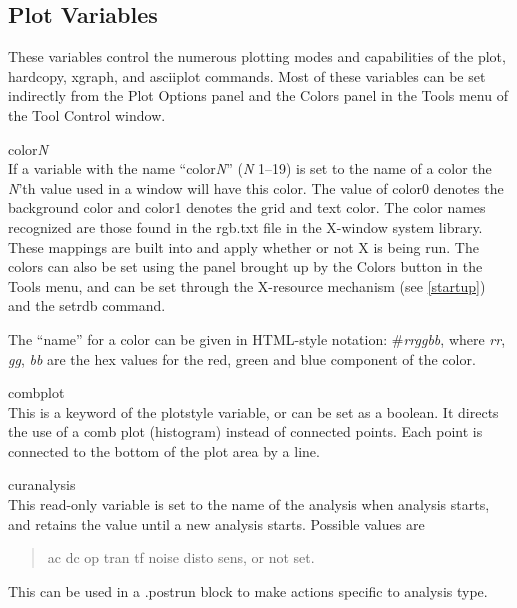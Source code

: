 \subsection{Plot Variables}
\label{plotvars}


These variables control the numerous plotting modes and capabilities
of the {\cb plot}, {\cb hardcopy}, {\cb xgraph}, and {\cb asciiplot}
commands.  Most of these variables can be set indirectly from the
{\cb Plot Options} panel and the {\cb Colors} panel in the {\cb Tools}
menu of the {\cb Tool Control} window.

\begin{description}
\item{\et color}{\it N}\\
If a variable with the name ``{\vt color}{\it N\/}'' ({\it N} 1--19)
is set to the name of a color the {\it N\/}'th value used in a window
will have this color.  The value of {\vt color0} denotes the
background color and {\vt color1} denotes the grid and text color. 
The color names recognized are those found in the {\vt rgb.txt} file
in the X-window system library.  These mappings are built into
{\WRspice} and apply whether or not X is being run.  The colors can
also be set using the panel brought up by the {\cb Colors} button in
the {\cb Tools} menu, and can be set through the X-resource mechanism
(see \ref{startup}) and the {\cb setrdb} command.

The ``name'' for a color can be given in HTML-style notation:  {\vt
\#}{\it rrggbb\/}, where {\it rr}, {\it gg}, {\it bb} are the hex
values for the red, green and blue component of the color.

\item{\et combplot}\\
This is a keyword of the {\et plotstyle} variable, or can be set as a
boolean.  It directs the use of a comb plot (histogram) instead of
connected points.  Each point is connected to the bottom of the plot
area by a line.

\item{\et curanalysis}\\
This read-only variable is set to the name of the analysis when
analysis starts, and retains the value until a new analysis starts. 
Possible values are
\begin{quote}
{\vt ac dc op tran tf noise disto sens}, or not set.
\end{quote}
This can be used in a {\vt .postrun} block to make actions specific to
analysis type.


\end{description}
